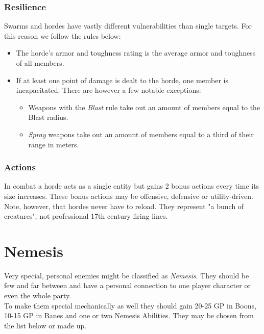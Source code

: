\documentclass[12pt,a4paper,openany]{book}
\begin{document}
	\subsection*{Resilience}
	Swarms and hordes have vastly different vulnerabilities than single targets. For this reason we follow the rules below:
	\begin{itemize}
		\setlength\itemsep{-8mm} \vspace{-8mm}
		\item The horde's armor and toughness rating is the average armor and toughness of all members.
		\item If at least one point of damage is dealt to the horde, one member is incapacitated. There are however a few notable exceptions:
			\begin{itemize}
				\setlength\itemsep{-8mm} \vspace{-8mm}
				\item Weapons with the \emph{Blast} rule take out an amount of members equal to the Blast radius.
				\item \emph{Spray} weapons take out an amount of members equal to a third of their range in meters.
			\end{itemize}
	\end{itemize}
	
	\subsection*{Actions}
	In combat a horde acts as a single entity but gains 2 bonus actions every time its size increases. These bonus actions may be offensive, defensive or utility-driven. \\
	Note, however, that hordes never have to reload. They represent "a bunch of creatures", not professional 17th century firing lines.


	\chapter{Nemesis}
	Very special, personal enemies might be classified as \emph{Nemesis}. They should be few and far between and have a personal connection to one player character or even the whole party.\\
	To make them special mechanically as well they should gain 20-25 GP in Boons, 10-15 GP in Banes and one or two Nemesis Abilities. They may be chosen from the list below or made up.
\end{document}
